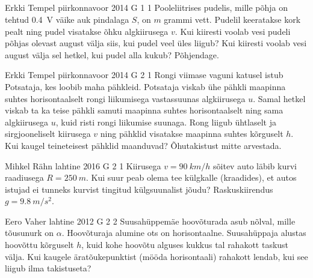 \documentclass[11pt, twoside]{article}
\begin{document}
{        \subsection{\protect{}}

\graphicspath{{../problems/}}

{Erkki Tempel} %
{piirkonnavoor} %
{2014} %
{G 1} %
{1} %
{
\ifStatement
Pooleliitrises pudelis, mille põhja on tehtud \SI{0.4}{V} väike auk pindalaga $S$, on $m$ grammi vett. Pudelil keeratakse kork pealt ning pudel visatakse õhku algkiirusega $v$. Kui kiiresti voolab vesi pudeli põhjas olevast august välja siis, kui pudel veel üles liigub? Kui kiiresti voolab vesi august välja sel hetkel, kui pudel alla kukub? Põhjendage.
\fi
}

{Erkki Tempel} %
{piirkonnavoor} %
{2014} %
{G 2} %
{1} %
{
\ifStatement
Rongi viimase vaguni katusel istub Potsataja, kes loobib maha pähkleid. Potsataja viskab ühe pähkli maapinna suhtes horisontaalselt rongi liikumisega vastassuunas algkiirusega $u$. Samal hetkel viskab ta ka teise pähkli samuti maapinna suhtes horisontaalselt ning sama algkiirusega $u$, kuid risti rongi liikumise suunaga. Rong liigub ühtlaselt ja sirgjooneliselt kiirusega $v$ ning pähklid visatakse maapinna suhtes kõrguselt $h$. Kui kaugel teineteisest pähklid maanduvad? Õhutakistust mitte arvestada.
\fi
}

{Mihkel Rähn} %
{lahtine} %
{2016} %
{G 2} %
{1} %
{
\ifStatement
Kiirusega $v=\SI{90}{km/h}$ sõitev auto läbib kurvi raadiusega $R=\SI{250}{m}$. Kui suur peab olema tee külgkalle (kraadides), et autos istujad ei tunneks kurvist tingitud külgsuunalist jõudu? Raskuskiirendus $g=\SI{9.8}{m/s^{2}}$.
\fi
}

{Eero Vaher} %
{lahtine} %
{2012} %
{G 2} %
{2} %
{
\ifStatement
Suusahüppemäe hoovõturada asub nõlval, mille tõusunurk on $\alpha$. Hoovõturaja alumine
ots on horisontaalne. Suusahüppaja alustas hoovõttu kõrguselt $h$,
kuid kohe hoovõtu alguses kukkus tal rahakott taskust välja. Kui kaugele
äratõukepunktist (mööda
horisontaali) rahakott lendab, kui see liigub ilma takistuseta?
\fi
}

}
\end{document}
